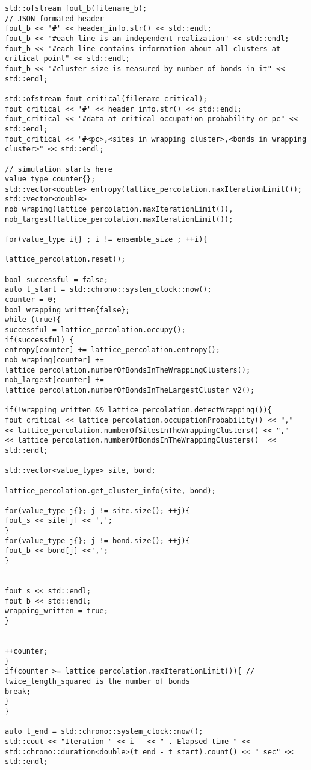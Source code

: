 \begin{lstlisting}[style=CStyle]
std::ofstream fout_b(filename_b);
// JSON formated header
fout_b << '#' << header_info.str() << std::endl;
fout_b << "#each line is an independent realization" << std::endl;
fout_b << "#each line contains information about all clusters at critical point" << std::endl;
fout_b << "#cluster size is measured by number of bonds in it" << std::endl;

std::ofstream fout_critical(filename_critical);
fout_critical << '#' << header_info.str() << std::endl;
fout_critical << "#data at critical occupation probability or pc" << std::endl;
fout_critical << "#<pc>,<sites in wrapping cluster>,<bonds in wrapping cluster>" << std::endl;

// simulation starts here
value_type counter{};
std::vector<double> entropy(lattice_percolation.maxIterationLimit());
std::vector<double> nob_wraping(lattice_percolation.maxIterationLimit()),
nob_largest(lattice_percolation.maxIterationLimit());

for(value_type i{} ; i != ensemble_size ; ++i){

lattice_percolation.reset();

bool successful = false;
auto t_start = std::chrono::system_clock::now();
counter = 0;
bool wrapping_written{false};
while (true){
successful = lattice_percolation.occupy();
if(successful) {
entropy[counter] += lattice_percolation.entropy();
nob_wraping[counter] += lattice_percolation.numberOfBondsInTheWrappingClusters();
nob_largest[counter] += lattice_percolation.numberOfBondsInTheLargestCluster_v2();

if(!wrapping_written && lattice_percolation.detectWrapping()){
fout_critical << lattice_percolation.occupationProbability() << ","
<< lattice_percolation.numberOfSitesInTheWrappingClusters() << ","
<< lattice_percolation.numberOfBondsInTheWrappingClusters()  << std::endl;

std::vector<value_type> site, bond;

lattice_percolation.get_cluster_info(site, bond);

for(value_type j{}; j != site.size(); ++j){
fout_s << site[j] << ',';
}
for(value_type j{}; j != bond.size(); ++j){
fout_b << bond[j] <<',';
}


fout_s << std::endl;
fout_b << std::endl;
wrapping_written = true;
}


++counter;
}
if(counter >= lattice_percolation.maxIterationLimit()){ // twice_length_squared is the number of bonds
break;
}
}

auto t_end = std::chrono::system_clock::now();
std::cout << "Iteration " << i   << " . Elapsed time " << std::chrono::duration<double>(t_end - t_start).count() << " sec" << std::endl;


\end{lstlisting}
